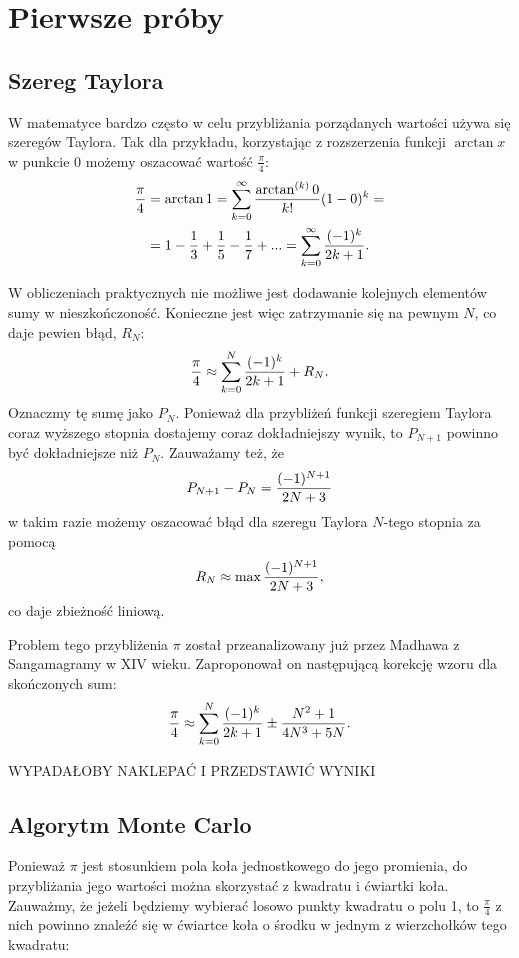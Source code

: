 \section{Pierwsze próby}

\subsection{Szereg Taylora}
W matematyce bardzo często w celu przybliżania porządanych wartości używa się szeregów Taylora. Tak dla przykładu, korzystając z rozszerzenia funkcji $\arctan x$ w punkcie $0$ możemy oszacować wartość $\frac\pi4$:
\begin{equation}
\begin{split}
    \frac\pi4&=\arctan1=\sum\limits_{k=0}^\infty{\arctan^{(k)}0\over k!}(1-0)^k=\\
    &=1-\frac13+\frac15-\frac17+...=\sum\limits_{k=0}^\infty{(-1)^k\over 2k+1}.
\end{split}
\end{equation}

W obliczeniach praktycznych nie możliwe jest dodawanie kolejnych elementów sumy w nieszkończoność. Konieczne jest więc zatrzymanie się na pewnym $N$, co daje pewien błąd, $R_N$:
$$\frac\pi4\approx \sum\limits_{k=0}^N{(-1)^k\over 2k+1}+R_N.$$
Oznaczmy tę sumę jako $P_N$. Ponieważ dla przybliżeń funkcji szeregiem Taylora coraz wyższego stopnia dostajemy coraz dokładniejszy wynik, to $P_{N+1}$ powinno być dokładniejsze niż $P_N$. Zauważamy też, że
$$P_{N+1}-P_N={(-1)^{N+1}\over 2N+3}$$
w takim razie możemy oszacować błąd dla szeregu Taylora $N$-tego stopnia za pomocą
$$R_N\approx \max{(-1)^{N+1}\over 2N+3},$$
co daje zbieżność liniową.

Problem tego przybliżenia $\pi$ został przeanalizowany już przez Madhawa z Sangamagramy w XIV wieku. Zaproponował on następującą korekcję wzoru dla skończonych sum:
\begin{equation}
    \frac\pi4\approx \sum\limits_{k=0}^N{(-1)^k\over 2k+1}\pm{N^2+1\over 4N^3+5N}.
\end{equation}

{\color{cyan}WYPADAŁOBY NAKLEPAĆ I PRZEDSTAWIĆ WYNIKI}


\subsection{Algorytm Monte Carlo}

Ponieważ $\pi$ jest stosunkiem pola koła jednostkowego do jego promienia, do przybliżania jego wartości można skorzystać z kwadratu i ćwiartki koła. Zauważmy, że jeżeli będziemy wybierać losowo punkty kwadratu o polu 1, to $\frac\pi4$ z nich powinno znaleźć się w ćwiartce koła o środku w jednym z wierzchołków tego kwadratu:

